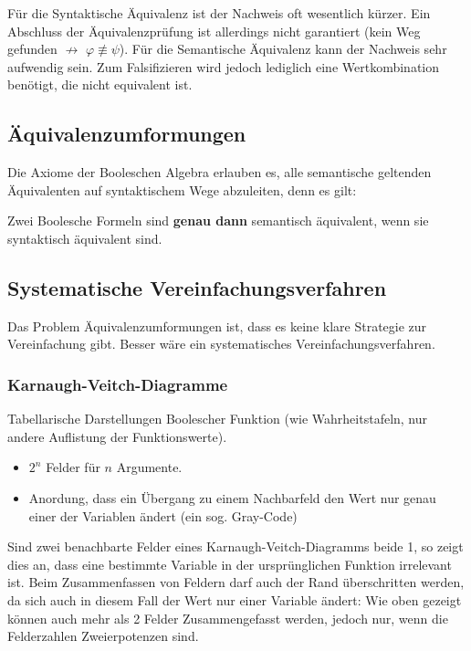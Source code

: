 \documentclass[12pt]{report}
\begin{document}
Für die Syntaktische Äquivalenz ist der Nachweis oft wesentlich kürzer. Ein Abschluss der Äquivalenzprüfung ist allerdings nicht garantiert (kein Weg gefunden $\not \rightarrow$ $\varphi \not \equiv \psi$).
Für die Semantische Äquivalenz kann der Nachweis sehr aufwendig sein. Zum Falsifizieren wird jedoch lediglich eine Wertkombination benötigt, die nicht equivalent ist.

\subsection{Äquivalenzumformungen}
Die Axiome der Booleschen Algebra erlauben es, alle semantische geltenden Äquivalenten auf syntaktischem Wege abzuleiten, denn es gilt:

\begin{center}
  Zwei Boolesche Formeln sind \textbf{genau dann} semantisch äquivalent, wenn sie syntaktisch äquivalent sind.
\end{center}


\subsection{Systematische Vereinfachungsverfahren}
Das Problem Äquivalenzumformungen ist, dass es keine klare Strategie zur Vereinfachung gibt.
Besser wäre ein systematisches Vereinfachungsverfahren.

\subsubsection{Karnaugh-Veitch-Diagramme}
\begin{defbox}
  Tabellarische Darstellungen Boolescher
  Funktion (wie Wahrheitstafeln, nur andere Auflistung der Funktionswerte).
  \begin{itemize}
    \item $2^n$ Felder für $n$ Argumente.
    \item Anordung, dass ein Übergang zu einem Nachbarfeld den Wert nur genau einer der Variablen ändert (ein sog. Gray-Code)
  \end{itemize}
\end{defbox}

Sind zwei benachbarte Felder eines Karnaugh-Veitch-Diagramms beide 1, so zeigt dies an, dass eine bestimmte Variable in der ursprünglichen Funktion irrelevant ist.
Beim Zusammenfassen von Feldern darf auch der Rand überschritten werden, da sich auch in diesem Fall der Wert nur einer Variable ändert:
Wie oben gezeigt können auch mehr als 2 Felder Zusammengefasst werden, jedoch nur, wenn die Felderzahlen Zweierpotenzen sind.
\end{document}
